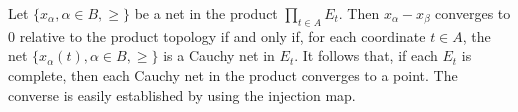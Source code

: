 Let $\{x_\alpha, \alpha \in B, \geq\}$ be a net in the product $\prod_{t \in A} E_t$. Then $x_\alpha - x_\beta$ converges to $0$ relative to the product topology if and only if, for each coordinate $t \in A$, the net $\{x_\alpha(t), \alpha \in B, \geq\}$ is a Cauchy net in $E_t$. It follows that, if each $E_t$ is complete, then each Cauchy net in the product converges to a point. The converse is easily established by using the injection map.
